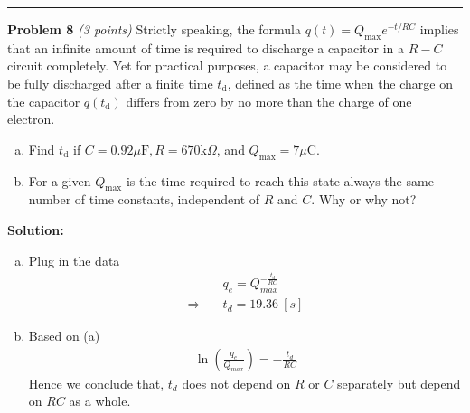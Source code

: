 \documentclass[a4paper, 11pt]{article}
\newenvironment{problem}[3][Problem]
    { \begin{mdframed}[backgroundcolor=gray!20] \textbf{#1 #2} \textit{(#3 points)} }
    {  \end{mdframed}}
\newenvironment{solution}
    {\textbf{Solution:}}
    {}
\begin{document}
\noindent\rule{7.1in}{2.8pt}

\begin{problem}{8}{3}
Strictly speaking, the formula $q(t)=Q_{\max } e^{-t / R C}$ implies that an infinite amount of time is required to discharge a capacitor
in a $R-C$ circuit completely. Yet for practical purposes, a capacitor may be considered to be fully discharged after a finite time
$t_{\mathrm{d}}$, defined as the time when the charge on the capacitor $q\left(t_{\mathrm{d}}\right)$ differs from zero by no more than
the charge of one electron.
\begin{enumerate}[(a)]
	\item Find $t_{\mathrm{d}}$ if $C=0.92 \mu \mathrm{F}, R=670 \mathrm{k} \Omega$, and $Q_{\max }=7 \mu \mathrm{C}$.
	\item For a given $Q_{\max }$ is the time required to reach this state always the same number of time constants, independent of $R$ and $C .$ Why or why not?
\end{enumerate}
\end{problem}

\begin{solution}
	\begin{enumerate}[(a)]
		\item Plug in the data
		      \begin{align*}
			                        & q_e = Q_{max}^{-\frac{t_d}{RC}} \\
			      \Rightarrow \quad & t_d = 19.36\ [s]
		      \end{align*}
		\item Based on (a)
		      \begin{align}
			      \ln\left( \frac{q_e}{Q_{max}} \right) = -\frac{t_d}{RC}
		      \end{align}
		      Hence we conclude that, $t_d$ does not depend on $R$ or $C$ separately but
		      depend on $RC$ as a whole.
	\end{enumerate}

\end{solution}
\end{document}

